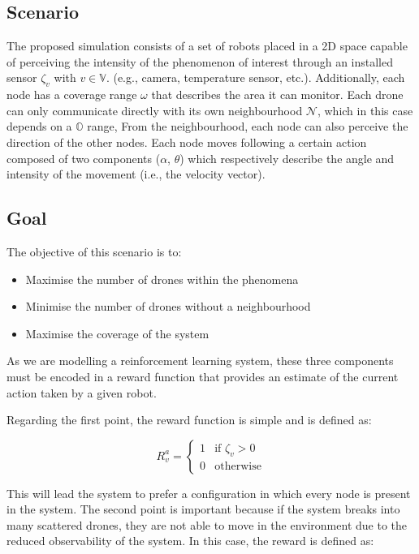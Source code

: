 \documentclass[conference]{IEEEtran}
\begin{document}
\subsection{Scenario}
The proposed simulation consists 
 of a set of robots placed in a 2D space capable of perceiving the intensity 
 of the phenomenon of interest through an installed sensor $\zeta_v$ with $v \in \mathbb{V}$. 
 (e.g., camera, temperature sensor, etc.). 
%
Additionally, each node has a coverage range $\omega$ 
 that describes the area it can monitor. 
 Each drone can only communicate directly with its own neighbourhood $\mathcal{N}$, 
 which in this case depends on a $\mathbb{O}$ range,
From the neighbourhood, 
 each node can also perceive the direction of the other nodes.
%
Each node moves following a certain action composed of two components ($\alpha$, $\theta$) 
 which respectively describe the angle and intensity of the movement (i.e., the velocity vector).
\subsection{Goal}
 The objective of this scenario is to:
\begin{itemize}
\item Maximise the number of drones within the phenomena
\item Minimise the number of drones without a neighbourhood
\item Maximise the coverage of the system
\end{itemize}
 
As we are modelling a reinforcement learning system, 
 these three components must be encoded in a reward function 
 that provides an estimate of the current action taken by a given robot.
 
 Regarding the first point, the reward function is simple and is defined as:
 
 \begin{equation*}
 R^a_{v} = \begin{cases}
  1 & \text{if } \zeta_v > 0 \\
  0 & \text{otherwise} 
 \end{cases}
 \end{equation*}
 
This will lead the system to prefer a configuration in which every node is present in the system. 
%
The second point is important because if the system breaks into many scattered drones, 
 they are not able to move in the environment due to the reduced observability of the system. 
 In this case, the reward is defined as:
 
\end{document}
